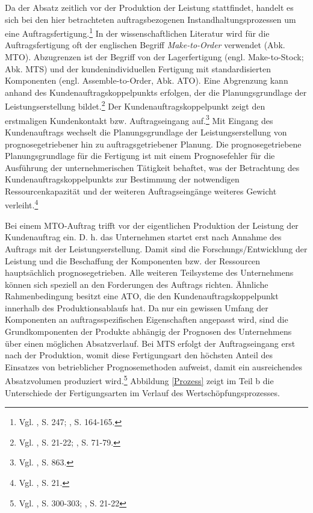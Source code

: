 Da der Absatz zeitlich vor der Produktion der Leistung stattfindet, handelt es sich bei den hier betrachteten auftragsbezogenen Instandhaltungsprozessen um eine Auftragsfertigung.\footnote{Vgl. \cite{hax1956industriebetrieb}, S. 247; \cite{Gutenberg1965dispos}, S. 164-165.} In der wissenschaftlichen Literatur wird für die Auftragsfertigung oft der englischen Begriff \textit{Make-to-Order} verwendet (Abk. MTO). Abzugrenzen ist der Begriff von der Lagerfertigung (engl. Make-to-Stock; Abk. MTS) und der kundenindividuellen Fertigung mit standardisierten Komponenten (engl. Assemble-to-Order, Abk. ATO). 
Eine Abgrenzung kann anhand des Kundenauftragskoppelpunkts erfolgen, der die Planungsgrundlage der Leistungserstellung bildet.\footnote{Vgl. \cite{quante2009management}, S. 21-22; \cite{sharman1984rediscovery}, S. 71-79.} Der Kundenauftragskoppelpunkt zeigt den erstmaligen Kundenkontakt bzw. Auftragseingang auf.\footnote{Vgl. \cite{Olhager2010863}, S. 863.} Mit Eingang des Kundenauftrags wechselt die Planungsgrundlage der Leistungserstellung von prognosegetriebener hin zu auftragsgetriebener Planung. Die prognosegetriebene Planungsgrundlage für die Fertigung ist mit einem Prognosefehler für die Ausführung der unternehmerischen Tätigkeit behaftet, was der Betrachtung des Kundenauftragskoppelpunkts zur Bestimmung der notwendigen Ressourcenkapazität und der weiteren Auftragseingänge weiteres Gewicht verleiht.\footnote{Vgl. \cite{quante2009management}, S. 21.} 

Bei einem MTO-Auftrag trifft vor der eigentlichen Produktion der Leistung der Kundenauftrag ein. D. h. das Unternehmen startet erst nach Annahme des Auftrags mit der Leistungserstellung. Damit sind die Forschungs/Entwicklung der Leistung und die Beschaffung der Komponenten bzw. der Ressourcen hauptsächlich prognosegetrieben. Alle weiteren Teilsysteme des Unternehmens können sich speziell an den Forderungen des Auftrags richten. Ähnliche Rahmenbedingung besitzt eine ATO, die den Kundenauftragskoppelpunkt innerhalb des Produktionsablaufs hat. Da nur ein gewissen Umfang der Komponenten an auftragsspezifischen Eigenschaften angepasst wird, sind die Grundkomponenten der Produkte abhängig der Prognosen des Unternehmens über einen möglichen Absatzverlauf. Bei MTS erfolgt der Auftragseingang erst nach der Produktion, womit diese Fertigungsart den höchsten Anteil des Einsatzes von betrieblicher Prognosemethoden aufweist, damit ein ausreichendes Absatzvolumen produziert wird.\footnote{Vgl. \cite{fleischmeyr2004codp}, S. 300-303; \cite{quante2009management}, S. 21-22} Abbildung \ref{Prozess} zeigt im Teil b die Unterschiede der Fertigungsarten im Verlauf des Wertschöpfungsprozesses. 

